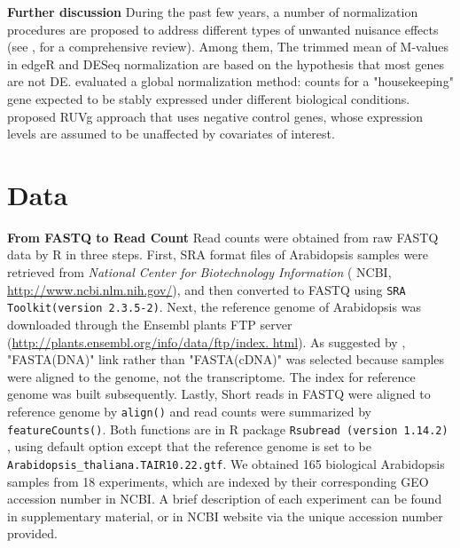 \documentclass[11pt, a4paper]{article}
\begin{document}
{ \bf Further discussion} During the past few years, a number of normalization procedures are proposed
to address different types of unwanted nuisance effects (see
\cite{dillies2013comprehensive}, \cite{risso2014nat} for a comprehensive
review). Among them,  The trimmed mean of M-values in edgeR\citep{edgeR} and
DESeq normalization \citep{anders2010differential} are based on the hypothesis
that most genes are not DE. \cite{bullard2010evaluation} evaluated a global
normalization method: counts for a "housekeeping" gene expected to be stably
expressed under different biological conditions. \cite{risso2014nat}  proposed
RUVg approach that uses negative control genes, whose expression levels are
assumed to be unaffected by covariates of interest. 



\section{Data}

\textbf{From FASTQ to Read Count} Read counts were obtained from raw FASTQ data by R in three steps. First, SRA format files of Arabidopsis samples were retrieved from \textit{National Center for Biotechnology Information}  ( NCBI, \url{http://www.ncbi.nlm.nih.gov/}), and then converted to FASTQ using \verb"SRA Toolkit(version 2.3.5-2)". Next, the reference genome of Arabidopsis was downloaded  through the Ensembl plants FTP server (\url{http://plants.ensembl.org/info/data/ftp/index. html}). As suggested by \cite{anders2013count},  "FASTA(DNA)" link rather than "FASTA(cDNA)" was selected because samples were aligned to the genome, not the transcriptome. The index for reference genome was built subsequently.  Lastly, Short reads in FASTQ were  aligned to reference genome by  \verb"align()" and read counts were summarized by \verb"featureCounts()". Both functions are in R package \verb"Rsubread (version 1.14.2)"  \citep{shi2013subread},\nocite{liao2013subread} using default option except that the reference genome is set to be \verb"Arabidopsis_thaliana.TAIR10.22.gtf".  We obtained 165 biological Arabidopsis samples from 18 experiments, which are indexed by their corresponding GEO accession number in NCBI.  A brief description of each experiment can be found in supplementary material, or in NCBI website via the unique accession number provided.
  
\end{document}
